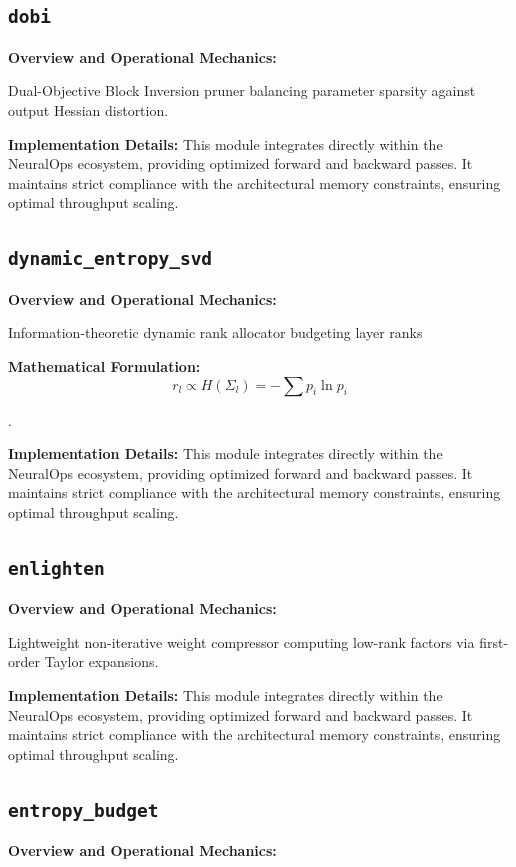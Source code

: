 \documentclass[10pt,twocolumn,letterpaper]{article}
\begin{document}
\subsection{\texttt{dobi}}
\textbf{Overview and Operational Mechanics:}

Dual-Objective Block Inversion pruner balancing parameter sparsity against output Hessian distortion.

\textbf{Implementation Details:}
This module integrates directly within the NeuralOps ecosystem, providing optimized forward and backward passes. It maintains strict compliance with the architectural memory constraints, ensuring optimal throughput scaling.

\subsection{\texttt{dynamic\_entropy\_svd}}
\textbf{Overview and Operational Mechanics:}

Information-theoretic dynamic rank allocator budgeting layer ranks

\textbf{Mathematical Formulation:}
\begin{equation}
r_l \propto H(\Sigma_l) = -\sum p_i \ln p_i
\end{equation}

.

\textbf{Implementation Details:}
This module integrates directly within the NeuralOps ecosystem, providing optimized forward and backward passes. It maintains strict compliance with the architectural memory constraints, ensuring optimal throughput scaling.

\subsection{\texttt{enlighten}}
\textbf{Overview and Operational Mechanics:}

Lightweight non-iterative weight compressor computing low-rank factors via first-order Taylor expansions.

\textbf{Implementation Details:}
This module integrates directly within the NeuralOps ecosystem, providing optimized forward and backward passes. It maintains strict compliance with the architectural memory constraints, ensuring optimal throughput scaling.

\subsection{\texttt{entropy\_budget}}
\textbf{Overview and Operational Mechanics:}
\end{document}
